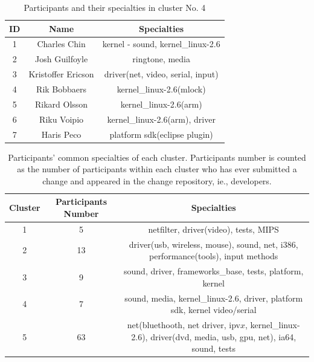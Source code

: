 \documentclass[10pt, conference, compsocconf]{IEEEtran}
\begin{document}
\begin{table}[!t]
\renewcommand{\arraystretch}{1.3}
\caption{Participants and their specialties in cluster No. 4}
\label{cluster_no4}
\centering
\begin{tabular}{|c|c|c|}
\hline
ID & Name & Specialties \\
\hline
1 & Charles Chin & kernel - sound, kernel\_linux-2.6 \\
\hline
2 & Josh Guilfoyle & ringtone, media \\
\hline
3 & Kristoffer Ericson & driver(net, video, serial, input) \\
\hline
4 & Rik Bobbaers & kernel\_linux-2.6(mlock) \\
\hline
5 & Rikard Olsson & kernel\_linux-2.6(arm) \\
\hline
6 & Riku Voipio & kernel\_linux-2.6(arm), driver \\
\hline
7 & Haris Peco & platform sdk(eclipse plugin) \\
\hline
\end{tabular}
\end{table}

\begin{table}[!t]
\caption{Participants' common specialties of each cluster. Participants number is counted as the number of participants within each cluster who has ever submitted a change and appeared in the change repository, ie., developers.}
\label{cluster_topic}
\centering
\begin{tabular}{|c|c|c|}
\hline
Cluster & Participants Number & Specialties \\
\hline
1 & 5 & netfilter, driver(video), tests, MIPS \\
\hline
2 & 13 & driver(usb, wireless, mouse), sound, net, i386, performance(tools), input methods \\
\hline
3 & 9 & sound, driver, frameworks\_base, tests, platform, kernel \\
\hline
4 & 7 & sound, media, kernel\_linux-2.6, driver, platform sdk, kernel video/serial \\
\hline
5 & 63 & net(bluethooth, net driver, ipv$x$, kernel\_linux-2.6), driver(dvd, media, usb, gpu, net), ia64, sound, tests \\
\hline
\end{tabular}
\end{table}
\end{document}
